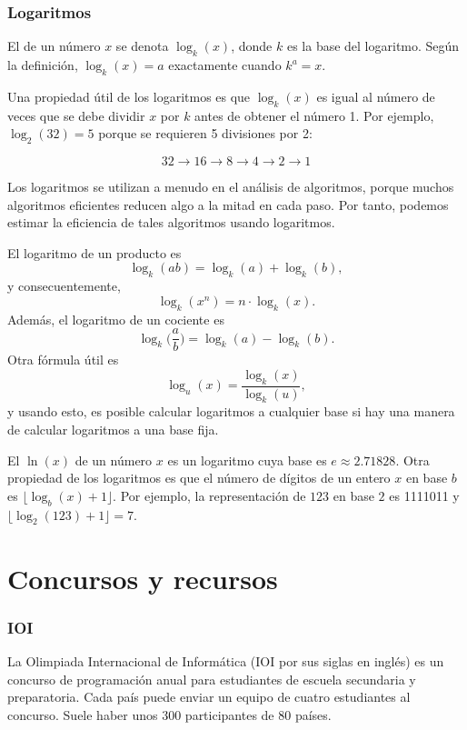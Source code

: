 \subsubsection{Logaritmos}


El  de un número $x$
se denota $\log_k(x)$, donde $k$ es la base
del logaritmo.
Según la definición,
$\log_k(x)=a$ exactamente cuando $k^a=x$.

Una propiedad útil de los logaritmos es
que $\log_k(x)$ es igual al número de veces que
se debe dividir $x$ por $k$ antes de obtener 
el número 1.
Por ejemplo, $\log_2(32)=5$
porque se requieren 5 divisiones por 2:

\[32 \rightarrow 16 \rightarrow 8 \rightarrow 4 \rightarrow 2 \rightarrow 1 \]

Los logaritmos se utilizan a menudo en el análisis de
algoritmos, porque muchos algoritmos eficientes
reducen algo a la mitad en cada paso.
Por tanto, podemos estimar la eficiencia de tales algoritmos
usando logaritmos.

El logaritmo de un producto es
\[\log_k(ab) = \log_k(a)+\log_k(b),\]
y consecuentemente,
\[\log_k(x^n) = n \cdot \log_k(x).\]
Además, el logaritmo de un cociente es
\[\log_k\Big(\frac{a}{b}\Big) = \log_k(a)-\log_k(b).\]
Otra fórmula útil es
\[\log_u(x) = \frac{\log_k(x)}{\log_k(u)},\]
y usando esto, es posible calcular
logaritmos a cualquier base si hay una manera de
calcular logaritmos a una base fija.


El  $\ln(x)$ de un número $x$
es un logaritmo cuya base es $e \approx 2.71828$.
Otra propiedad de los logaritmos es que
el número de dígitos de un entero $x$ en base $b$ es
$\lfloor \log_b(x)+1 \rfloor$.
Por ejemplo, la representación de
$123$ en base $2$ es 1111011 y
$\lfloor \log_2(123)+1 \rfloor = 7$.

\section{Concursos y recursos}

\subsubsection{IOI}

La Olimpiada Internacional de Informática (IOI por sus siglas en inglés)
es un concurso de programación anual para
estudiantes de escuela secundaria y preparatoria.
Cada país puede enviar un equipo de
cuatro estudiantes al concurso.
Suele haber unos 300 participantes
de 80 países.

